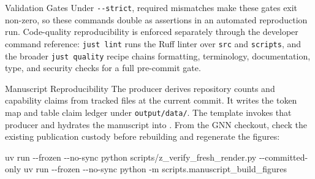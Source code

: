 \documentclass[
  ignorenonframetext,
]{beamer}
\newenvironment{Shaded}{}{}
\newcommand{\AttributeTok}[1]{\textcolor[rgb]{0.49,0.56,0.16}{#1}}
\newcommand{\ExtensionTok}[1]{#1}
\newcommand{\NormalTok}[1]{#1}
\begin{document}
\begin{frame}{Validation Gates}
Under \texttt{-\/-strict}, required mismatches make these gates exit
non-zero, so these commands double as assertions in an automated
reproduction run. Code-quality reproducibility is enforced separately
through the developer command reference: \texttt{just\ lint} runs the
Ruff linter over \texttt{src} and \texttt{scripts}, and the broader
\texttt{just\ quality} recipe chains formatting, terminology,
documentation, type, and security checks for a full pre-commit gate.
\end{frame}

\begin{frame}{Manuscript Reproducibility}
\protect{}\label{manuscript-reproducibility}
The producer derives repository counts and capability claims from
tracked files at the current commit. It writes the token map and table
claim ledger under \texttt{output/data/}. The template invokes that
producer and hydrates the manuscript into .
From the GNN checkout, check the existing publication custody before
rebuilding and regenerate the figures:

\begin{Shaded}
\begin{Highlighting}[]
\ExtensionTok{uv}\NormalTok{ run }\AttributeTok{{-}{-}frozen} \AttributeTok{{-}{-}no{-}sync}\NormalTok{ python scripts/z\_verify\_fresh\_render.py }\AttributeTok{{-}{-}committed{-}only}
\ExtensionTok{uv}\NormalTok{ run }\AttributeTok{{-}{-}frozen} \AttributeTok{{-}{-}no{-}sync}\NormalTok{ python }\AttributeTok{{-}m}\NormalTok{ scripts.manuscript\_build\_figures}
\end{Highlighting}
\end{Shaded}

\end{frame}
\end{document}
